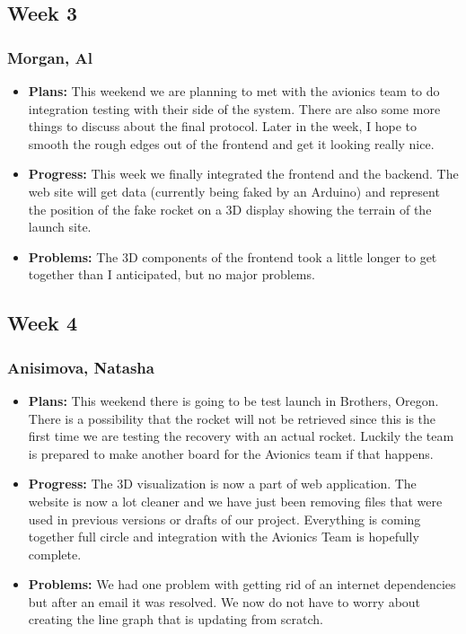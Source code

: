\documentclass[10pt,draftclsnofoot,onecolumn]{IEEEtran}
\begin{document}
\subsection{Week 3}
\subsubsection{Morgan, Al}
\begin{itemize}
	\item \textbf{Plans: }
	This weekend we are planning to met with the avionics team to do integration testing with their side of the system. There are also some more things to discuss about the final protocol. Later in the week, I hope to smooth the rough edges out of the frontend and get it looking really nice.
	\item \textbf{Progress: }
	This week we finally integrated the frontend and the backend. The web site will get data (currently being faked by an Arduino) and represent the position of the fake rocket on a 3D display showing the terrain of the launch site.
	\item \textbf{Problems: }
	The 3D components of the frontend took a little longer to get together than I anticipated, but no major problems.
\end{itemize}

\subsection{Week 4}
\subsubsection{Anisimova, Natasha}
\begin{itemize}
	\item \textbf{Plans: }
	This weekend there is going to be test launch in Brothers, Oregon. There is a possibility that the rocket will not be retrieved since this is the first time we are testing the recovery with an actual rocket. Luckily the team is prepared to make another board for the Avionics team if that happens.
	\item \textbf{Progress:  }
	The 3D visualization is now a part of web application. The website is now a lot cleaner and we have just been removing files that were used in previous versions or drafts of our project. Everything is coming together full circle and integration with the Avionics Team is hopefully complete.
	\item \textbf{Problems: }
	We had one problem with getting rid of an internet dependencies but after an email it was resolved. We now do not have to worry about creating the line graph that is updating from scratch.
\end{itemize}
\end{document}
